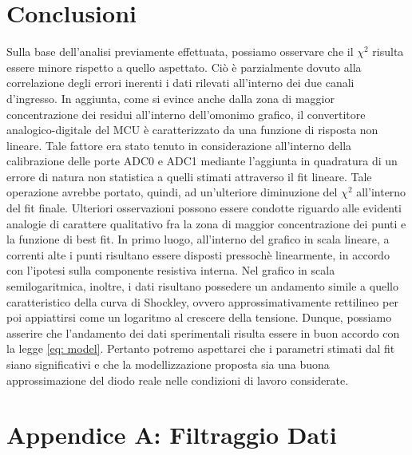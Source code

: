 \documentclass{article}[a4paper, oneside, 11pt]
\begin{document}
\section{Conclusioni}
Sulla base dell'analisi previamente effettuata, possiamo osservare che il $\chi^2$ risulta essere
minore rispetto a quello aspettato. Ciò \`e  parzialmente dovuto alla correlazione degli errori inerenti
i dati rilevati all'interno dei due canali d'ingresso. In aggiunta, come si evince anche dalla zona di
maggior concentrazione dei residui all'interno dell'omonimo grafico, il convertitore analogico-digitale
del MCU \`e caratterizzato da una funzione di risposta non lineare. Tale fattore era stato tenuto in
considerazione all'interno della calibrazione delle porte ADC0 e ADC1 mediante l'aggiunta in 
quadratura di un errore di natura non statistica a quelli stimati attraverso il fit lineare. Tale
operazione avrebbe portato, quindi, ad un'ulteriore diminuzione del $\chi^2$ all'interno del fit finale.
Ulteriori osservazioni possono essere condotte riguardo alle evidenti analogie di carattere qualitativo
fra la zona di maggior concentrazione dei punti e la funzione di best fit.
In primo luogo, all'interno del grafico in scala lineare, a correnti alte i punti risultano essere disposti
pressoch\`e linearmente, in accordo con l'ipotesi sulla componente resistiva interna. Nel grafico in scala
semilogaritmica, inoltre, i dati risultano possedere un andamento simile a quello caratteristico della
curva di Shockley, ovvero approssimativamente rettilineo per poi appiattirsi come un logaritmo al
crescere della tensione. Dunque, possiamo asserire che l'andamento dei
dati sperimentali risulta essere in buon accordo con la legge \eqref{eq: model}.
Pertanto potremo aspettarci che i parametri stimati dal fit siano significativi 
e che la modellizzazione proposta sia una buona approssimazione del diodo reale 
nelle condizioni di lavoro considerate.
\section{Appendice A: Filtraggio Dati}\label{app: A}

\end{document}
